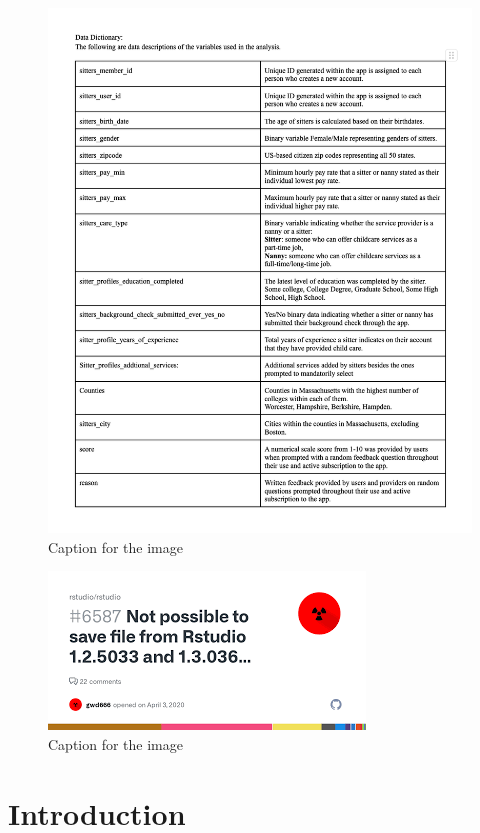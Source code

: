 \documentclass[12pt]{article}
\begin{document}
\begin{figure}
\centering
\includegraphics{IMAGES/data_dictionary.png}
\caption{Caption for the image}
\end{figure}

\begin{figure}
\centering
\includegraphics{IMAGES/EXAMPLE.png}
\caption{Caption for the image}
\end{figure}

\hypertarget{introduction}{%
\section{Introduction}\label{introduction}}
\end{document}
